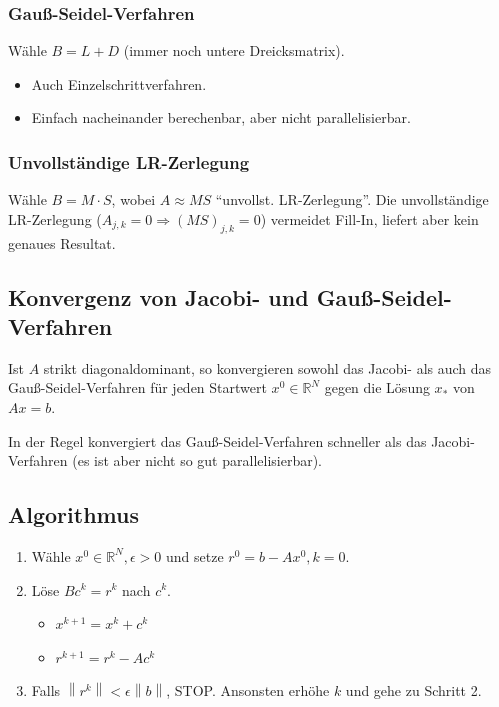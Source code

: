 \documentclass[a4paper, 14pt]{article}
\newcommand{\norm}[1]{\left\lVert#1\right\rVert}
\begin{document}
	\subsubsection{Gauß-Seidel-Verfahren}

	Wähle $B = L + D$ (immer noch untere Dreicksmatrix).

	\begin{itemize}
		\item Auch Einzelschrittverfahren.
		\item Einfach nacheinander berechenbar, aber nicht parallelisierbar.
	\end{itemize}

	\subsubsection{Unvollständige LR-Zerlegung}

	Wähle $B = M \cdot S$, wobei $A \approx M S$ \enquote{unvollst. LR-Zerlegung}.
	Die unvollständige LR-Zerlegung ($A_{j,k} = 0 \Rightarrow (MS)_{j,k} = 0$) vermeidet Fill-In, liefert aber kein genaues Resultat.

	\subsection{Konvergenz von Jacobi- und Gauß-Seidel-Verfahren}

	Ist $A$ strikt diagonaldominant, so konvergieren sowohl das Jacobi- als auch das Gauß-Seidel-Verfahren für jeden Startwert $x^0 \in \mathbb{R}^N$ gegen die Lösung $x_*$ von $Ax = b$.

	In der Regel konvergiert das Gauß-Seidel-Verfahren schneller als das Jacobi-Verfahren (es ist aber nicht so gut parallelisierbar).

	\subsection{Algorithmus}

	\begin{enumerate}
		\item Wähle $x^0 \in \mathbb{R}^N, \epsilon > 0$ und setze $r^0 = b - A x^0, k = 0$.
		\item Löse $B c^k = r^k$ nach $c^k$.
		\begin{itemize}
			\item $x^{k + 1} = x^k + c^k$
			\item $r^{k + 1} = r^k - A c^k$
		\end{itemize}
		\item Falls $\norm{r^k} < \epsilon \norm{b}$, STOP. Ansonsten erhöhe $k$ und gehe zu Schritt 2.
	\end{enumerate}
\end{document}
